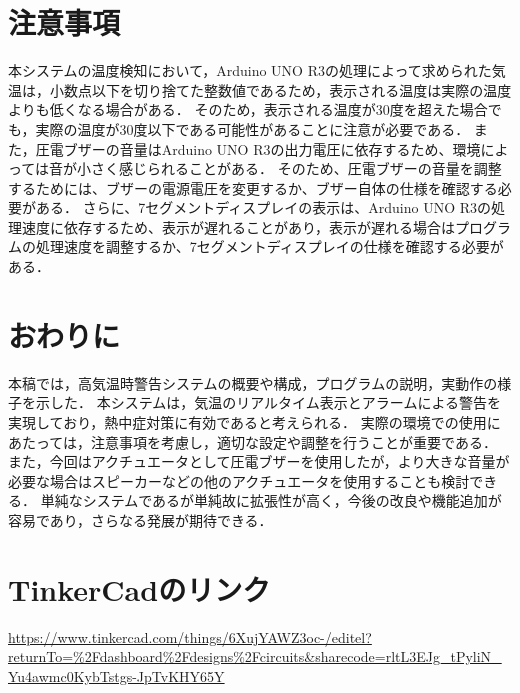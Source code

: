 \documentclass[uplatex,dvipdfmx]{jsarticle}
\begin{document}
\section{注意事項}
\indent
本システムの温度検知において，Arduino UNO R3の処理によって求められた気温は，小数点以下を切り捨てた整数値であるため，表示される温度は実際の温度よりも低くなる場合がある．
そのため，表示される温度が30度を超えた場合でも，実際の温度が30度以下である可能性があることに注意が必要である．
また，圧電ブザーの音量はArduino UNO R3の出力電圧に依存するため、環境によっては音が小さく感じられることがある．
そのため、圧電ブザーの音量を調整するためには、ブザーの電源電圧を変更するか、ブザー自体の仕様を確認する必要がある．
さらに、7セグメントディスプレイの表示は、Arduino UNO R3の処理速度に依存するため、表示が遅れることがあり，表示が遅れる場合はプログラムの処理速度を調整するか、7セグメントディスプレイの仕様を確認する必要がある．

\section{おわりに}
\indent
本稿では，高気温時警告システムの概要や構成，プログラムの説明，実動作の様子を示した．
本システムは，気温のリアルタイム表示とアラームによる警告を実現しており，熱中症対策に有効であると考えられる．
実際の環境での使用にあたっては，注意事項を考慮し，適切な設定や調整を行うことが重要である．
また，今回はアクチュエータとして圧電ブザーを使用したが，より大きな音量が必要な場合はスピーカーなどの他のアクチュエータを使用することも検討できる．
単純なシステムであるが単純故に拡張性が高く，今後の改良や機能追加が容易であり，さらなる発展が期待できる．

\section{TinkerCadのリンク}
\url{https://www.tinkercad.com/things/6XujYAWZ3oc-/editel?returnTo=%2Fdashboard%2Fdesigns%2Fcircuits&sharecode=rltL3EJg_tPyliN_Yu4awmc0KybTstgs-JpTvKHY65Y}
\end{document}
